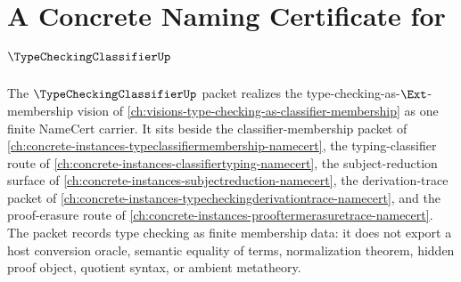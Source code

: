 \chapter{A Concrete Naming Certificate for $\TypeCheckingClassifierUp$}
\label{ch:concrete-instances-type-checking-classifier-namecert}

The $\TypeCheckingClassifierUp$ packet realizes the type-checking-as-$\Ext$-membership vision of \autoref{ch:visions-type-checking-as-classifier-membership} as one finite NameCert carrier. It sits beside the classifier-membership packet of \autoref{ch:concrete-instances-typeclassifiermembership-namecert}, the typing-classifier route of \autoref{ch:concrete-instances-classifiertyping-namecert}, the subject-reduction surface of \autoref{ch:concrete-instances-subjectreduction-namecert}, the derivation-trace packet of \autoref{ch:concrete-instances-typecheckingderivationtrace-namecert}, and the proof-erasure route of \autoref{ch:concrete-instances-prooftermerasuretrace-namecert}. The packet records type checking as finite membership data: it does not export a host conversion oracle, semantic equality of terms, normalization theorem, hidden proof object, quotient syntax, or ambient metatheory.

